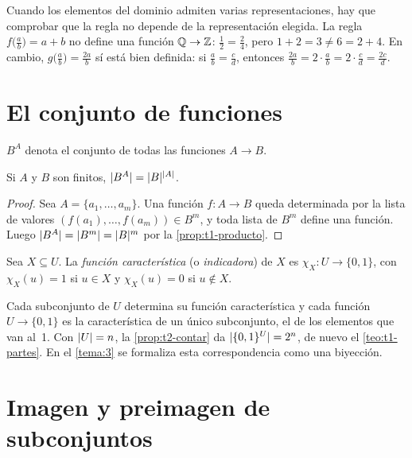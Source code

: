 \begin{ejemplo}\label{ej:t2-biendef}
Cuando los elementos del dominio admiten varias representaciones, hay que comprobar que la regla no depende de la representación elegida. La regla $f\bigl(\tfrac{a}{b}\bigr)=a+b$ no define una función $\mathbb{Q}\to\mathbb{Z}$: $\tfrac12=\tfrac24$, pero $1+2=3\neq 6=2+4$. En cambio, $g\bigl(\tfrac ab\bigr)=\tfrac{2a}{b}$ sí está bien definida: si $\tfrac ab=\tfrac cd$, entonces $\tfrac{2a}{b}=2\cdot\tfrac ab=2\cdot\tfrac cd=\tfrac{2c}{d}$.
\end{ejemplo}

\section{El conjunto de funciones}

\begin{definicion}
$B^{A}$ denota el conjunto de todas las funciones $A\to B$.
\end{definicion}

\begin{proposicion}\label{prop:t2-contar}
Si $A$ y $B$ son finitos, $\lvert B^{A}\rvert=\lvert B\rvert^{\lvert A\rvert}$.
\end{proposicion}

\begin{proof}
Sea $A=\{a_1,\dots,a_m\}$. Una función $f\colon A\to B$ queda determinada por la lista de valores $(f(a_1),\dots,f(a_m))\in B^{m}$, y toda lista de $B^{m}$ define una función. Luego $\lvert B^{A}\rvert=\lvert B^{m}\rvert=\lvert B\rvert^{m}$ por la \cref{prop:t1-producto}.
\end{proof}

\begin{definicion}
Sea $X\subseteq U$. La \emph{función característica} (o \emph{indicadora}) de $X$ es $\chi_X\colon U\to\{0,1\}$, con $\chi_X(u)=1$ si $u\in X$ y $\chi_X(u)=0$ si $u\notin X$.
\end{definicion}

Cada subconjunto de $U$ determina su función característica y cada función $U\to\{0,1\}$ es la característica de un único subconjunto, el de los elementos que van al~1. Con $\lvert U\rvert=n$, la \cref{prop:t2-contar} da $\lvert\{0,1\}^{U}\rvert=2^{n}$, de nuevo el \cref{teo:t1-partes}. En el \cref{tema:3} se formaliza esta correspondencia como una biyección.

\section{Imagen y preimagen de subconjuntos}

